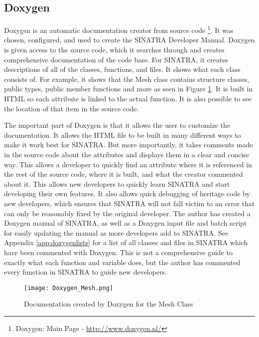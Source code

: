 \subsection{Doxygen}
Doxygen is an automatic documentation creator from source code \footnote{Doxygen:  Main Page - \url{http://www.doxygen.nl/}}. It was chosen, configured, and used to create the SINATRA Developer Manual. Doxygen is given access to the source code, which it searches through and creates comprehensive documentation of the code base. For SINATRA, it creates descriptions of all of the classes, functions, and files. It shows what each class consists of. For example, it shows that the Mesh class contains structure classes, public types, public member functions and more as seen in Figure \ref{fig:Doxygen_Mesh}. It is built in HTML so each attribute is linked to the actual function. It is also possible to see the location of that item in the source code. \par


\indent The important part of Doxygen is that it allows the user to customize the documentation. It allows the HTML file to be built in many different ways to make it work best for SINATRA. But more importantly, it takes comments made in the source code about the attributes and displays them in a clear and concise way. This allows a developer to quickly find an attribute where it is referenced in the rest of the source code, where it is built, and what the creator commented about it. This allows new developers to quickly learn SINATRA and start developing their own features. It also allows quick debugging of heritage code by new developers, which ensures that SINATRA will not fall victim to an error that can only be reasonably fixed by the original developer. The author has created a Doxygen manual of SINATRA, as well as a Doxygen input file and batch script for easily updating the manual as more developers add to SINATRA. See Appendix \ref{app:doxygenlists} for a list of all classes and files in SINATRA which have been commented with Doxygen. This is not a comprehensive guide to exactly what each function and variable does, but the author has commented every function in SINATRA to guide new developers.


\begin{figure}
\texttt{[image: Doxygen\_Mesh.png]}
\centering
\caption{Documentation created by Doxygen for the Mesh Class}
\label{fig:Doxygen_Mesh}
\end{figure}


